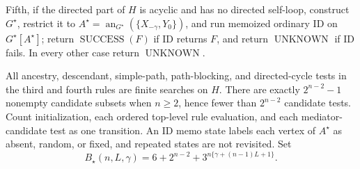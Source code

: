 Fifth, if the directed part of \(H\) is acyclic and has no directed self-loop, construct \(G^\star\), restrict it to \(A^\star=\operatorname{an}_{G^\star}(\{X_{-\gamma},Y_0\})\), and run memoized ordinary ID on \(G^\star[A^\star]\); return \(\operatorname{SUCCESS}(F)\) if ID returns \(F\), and return \(\operatorname{UNKNOWN}\) if ID fails.  In every other case return \(\operatorname{UNKNOWN}\).

All ancestry, descendant, simple-path, path-blocking, and directed-cycle tests in the third and fourth rules are finite searches on \(H\).  There are exactly \(2^{n-2}-1\) nonempty candidate subsets when \(n\ge2\), hence fewer than \(2^{n-2}\) candidate tests.  Count initialization, each ordered top-level rule evaluation, and each mediator-candidate test as one transition.  An ID memo state labels each vertex of \(A^\star\) as absent, random, or fixed, and repeated states are not revisited.  Set
\[
 B_\star(n,L,\gamma)
 =6+2^{n-2}+3^{n\{\gamma+(n-1)L+1\}}.
\]
